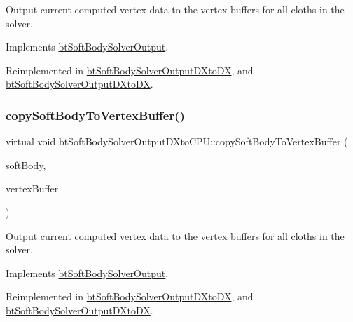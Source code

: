 Output current computed vertex data to the vertex buffers for all cloths in the solver. 

Implements \hyperlink{classbtSoftBodySolverOutput_a7c3761747267f87da347aad276218663}{bt\+Soft\+Body\+Solver\+Output}.



Reimplemented in \hyperlink{classbtSoftBodySolverOutputDXtoDX_ab1bb3e5dd8a6e45ad6063398682806cb}{bt\+Soft\+Body\+Solver\+Output\+D\+Xto\+DX}, and \hyperlink{classbtSoftBodySolverOutputDXtoDX_aac21bd05d5f1a2afb9ee855554ac13f1}{bt\+Soft\+Body\+Solver\+Output\+D\+Xto\+DX}.

\mbox{\label{classbtSoftBodySolverOutputDXtoCPU_abd837007ef454a8363e73ced3abf1f09}} 
\subsubsection{\texorpdfstring{copy\+Soft\+Body\+To\+Vertex\+Buffer()}{copySoftBodyToVertexBuffer()}\hspace{0.1cm}{\footnotesize\ttfamily [2/2]}}
{\footnotesize\ttfamily virtual void bt\+Soft\+Body\+Solver\+Output\+D\+Xto\+C\+P\+U\+::copy\+Soft\+Body\+To\+Vertex\+Buffer (\begin{DoxyParamCaption}\item[{const \hyperlink{classbtSoftBody}{bt\+Soft\+Body} $\ast$const}]{soft\+Body,  }\item[{\hyperlink{classbtVertexBufferDescriptor}{bt\+Vertex\+Buffer\+Descriptor} $\ast$}]{vertex\+Buffer }\end{DoxyParamCaption})\hspace{0.3cm}{\ttfamily [virtual]}}

Output current computed vertex data to the vertex buffers for all cloths in the solver. 

Implements \hyperlink{classbtSoftBodySolverOutput_a7c3761747267f87da347aad276218663}{bt\+Soft\+Body\+Solver\+Output}.



Reimplemented in \hyperlink{classbtSoftBodySolverOutputDXtoDX_ab1bb3e5dd8a6e45ad6063398682806cb}{bt\+Soft\+Body\+Solver\+Output\+D\+Xto\+DX}, and \hyperlink{classbtSoftBodySolverOutputDXtoDX_aac21bd05d5f1a2afb9ee855554ac13f1}{bt\+Soft\+Body\+Solver\+Output\+D\+Xto\+DX}.



